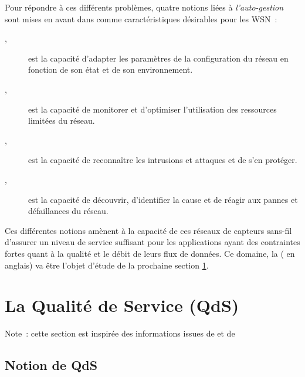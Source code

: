 \bigskip

Pour répondre à ces différents problèmes, quatre notions liées à
\emph{l'auto-gestion} sont mises en avant dans \cite{LivreDargie2010}
comme caractéristiques désirables pour les WSN~:

\begin{description}

\item[,] 
est la capacité d'adapter les paramètres de la configuration du réseau
en fonction de son état et de son environnement.

\item[,] 
est la capacité de monitorer et d'optimiser l'utilisation des ressources
limitées du réseau.

\item[,] 
est la capacité de reconnaître les intrusions et attaques et de s'en
protéger.

\item[,] 
est la capacité de découvrir, d'identifier la cause et de réagir aux
pannes et défaillances du réseau.

\end{description}

Ces différentes notions amènent à la capacité de ces réseaux de capteurs
sans-fil d'assurer un niveau de service suffisant pour les applications
ayant des contraintes fortes quant à la qualité et le débit de leurs
flux de données. Ce domaine, la  (
en anglais) va être l'objet d'étude de la prochaine section \ref{SecQdS}.


\section{La Qualité de Service (QdS)}
\label{SecQdS}

Note~: cette section est inspirée des informations issues de
\cite{TheseBNefzi} et de \cite{CCMQdS}


\subsection{Notion de QdS}
\label{SubsecDefQdS}

